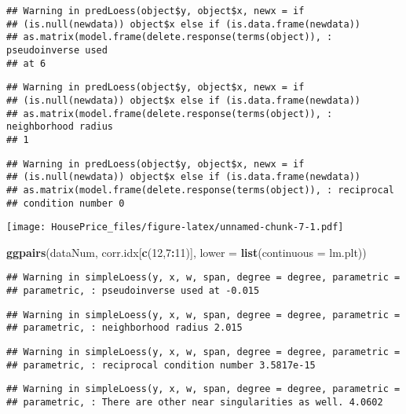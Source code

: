 \documentclass[]{article}
\newenvironment{Shaded}{\begin{snugshade}}{\end{snugshade}}
\newcommand{\KeywordTok}[1]{\textcolor[rgb]{0.13,0.29,0.53}{\textbf{#1}}}
\newcommand{\DataTypeTok}[1]{\textcolor[rgb]{0.13,0.29,0.53}{#1}}
\newcommand{\DecValTok}[1]{\textcolor[rgb]{0.00,0.00,0.81}{#1}}
\newcommand{\OperatorTok}[1]{\textcolor[rgb]{0.81,0.36,0.00}{\textbf{#1}}}
\newcommand{\NormalTok}[1]{#1}
\begin{document}
\begin{verbatim}
## Warning in predLoess(object$y, object$x, newx = if
## (is.null(newdata)) object$x else if (is.data.frame(newdata))
## as.matrix(model.frame(delete.response(terms(object)), : pseudoinverse used
## at 6
\end{verbatim}

\begin{verbatim}
## Warning in predLoess(object$y, object$x, newx = if
## (is.null(newdata)) object$x else if (is.data.frame(newdata))
## as.matrix(model.frame(delete.response(terms(object)), : neighborhood radius
## 1
\end{verbatim}

\begin{verbatim}
## Warning in predLoess(object$y, object$x, newx = if
## (is.null(newdata)) object$x else if (is.data.frame(newdata))
## as.matrix(model.frame(delete.response(terms(object)), : reciprocal
## condition number 0
\end{verbatim}

\texttt{[image: HousePrice\_files/figure-latex/unnamed-chunk-7-1.pdf]}

\begin{Shaded}
\begin{Highlighting}[]
\KeywordTok{ggpairs}\NormalTok{(dataNum, corr.idx[}\KeywordTok{c}\NormalTok{(}\DecValTok{12}\NormalTok{,}\DecValTok{7}\OperatorTok{:}\DecValTok{11}\NormalTok{)], }\DataTypeTok{lower =} \KeywordTok{list}\NormalTok{(}\DataTypeTok{continuous =}\NormalTok{ lm.plt))}
\end{Highlighting}
\end{Shaded}

\begin{verbatim}
## Warning in simpleLoess(y, x, w, span, degree = degree, parametric =
## parametric, : pseudoinverse used at -0.015
\end{verbatim}

\begin{verbatim}
## Warning in simpleLoess(y, x, w, span, degree = degree, parametric =
## parametric, : neighborhood radius 2.015
\end{verbatim}

\begin{verbatim}
## Warning in simpleLoess(y, x, w, span, degree = degree, parametric =
## parametric, : reciprocal condition number 3.5817e-15
\end{verbatim}

\begin{verbatim}
## Warning in simpleLoess(y, x, w, span, degree = degree, parametric =
## parametric, : There are other near singularities as well. 4.0602
\end{verbatim}
\end{document}
